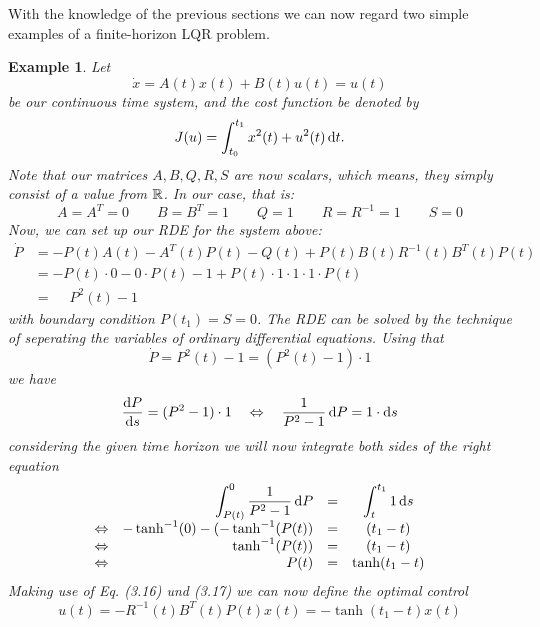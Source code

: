\documentclass[paper=a4, pagesize, DIV=calc, BCOR=12.5mm, twoside=on, onecolumn=on, open = any, titlepage =on, parskip =half-, headsepline = on, footsepline = on, chapterprefix = on, appendixprefix = off, fontsize = 12pt, numbers = noenddot, abstract = on]{scrbook}
\numberwithin{equation}{chapter}
\theoremstyle{definition}
\theoremstyle{plain}
\newtheorem{beispiel}{Example}
\theoremstyle{plain}
\theoremstyle{remark}
\theoremstyle{plain}
\theoremstyle{plain}
\begin{document}
\vspace*{1.5cm}
With the knowledge of the previous sections we can now regard two simple examples of a finite-horizon LQR problem.
\begin{beispiel}
\label{ex:x=u without r}
Let \[\dot{x} = A(t)x(t) + B(t)u(t) = u(t)\] be our continuous time system, and the cost function be denoted by \[
J(u) = \int_{t_0}^{t_1} x^2(t) + u^2(t) \mathop{}\!\mathrm{d} t.
\]
Note that our matrices $A, B, Q, R, S$ are now scalars, which means, they simply consist of a value from $\mathbb{R}$. In our case, that is:
\[
A = A^T = 0 \qquad B = B^T =1 \qquad Q= 1 \qquad R = R^{-1}=1 \qquad S=0
\]
Now, we can set up our RDE for the system above:
\begin{align*}
\dot{P} &= -P(t)A(t) - A^T(t)P(t)-Q(t)+P(t)B(t)R^{-1}(t)B^T(t)P(t)\\
&= -P(t) \cdot 0 - 0 \cdot P(t) - 1 + P(t)\cdot 1 \cdot 1 \cdot 1 \cdot P(t)\\
&= \phantom{-}P^2(t) - 1
\end{align*}
with boundary condition $P(t_1) = S = 0$. The RDE can be solved by the technique of seperating the variables of ordinary differential equations. Using that
\[
\dot{P} = P^2(t) - 1 = (P^2(t) - 1) \cdot 1
\]
we have
\begin{equation*}
\frac{\mathop{}\!\mathrm{d} P}{\mathop{}\!\mathrm{d} s} = (P^2 - 1) \cdot 1 \quad \Leftrightarrow \quad \frac{1}{P^2-1} \mathop{}\!\mathrm{d} P = 1 \cdot \mathop{}\!\mathrm{d} s
\end{equation*}
considering the given time horizon we will now integrate both sides of the right equation 
\renewcommand\arraystretch{2}
\begin{equation*}
\begin{array}{lrcc}
& \displaystyle \int_{P(t)}^0 \frac{1}{P^2-1} \mathop{}\!\mathrm{d} P &=& \displaystyle \int_t^{t_1} 1 \mathop{}\!\mathrm{d} s\\
\Leftrightarrow & -\tanh^{-1}(0) - (-\tanh^{-1}(P(t)) &=& (t_1 - t)\\
\Leftrightarrow & \tanh^{-1}(P(t)) &=& (t_1 - t)\\
\Leftrightarrow & P(t) &=& \tanh(t_1-t)
\end{array}
\end{equation*}
Making use of Eq. (3.16) und (3.17) we can now define the optimal control
\begin{equation*}
u(t) = -R^{-1}(t)B^T(t)P(t)x(t) = - \tanh(t_1-t)x(t)
\end{equation*}
\end{beispiel}
\end{document}

